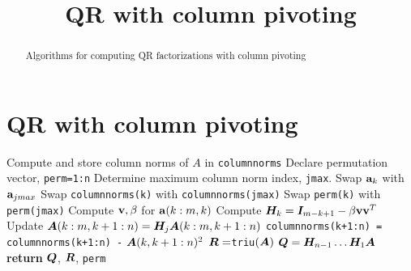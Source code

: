 \documentclass[preprint,12pt,authoryear]{elsarticle}
\begin{document}
\begin{frontmatter}


\title{QR with column pivoting}


\begin{abstract}{
Algorithms for computing QR factorizations with column pivoting
}
\end{abstract}

%

\end{frontmatter}

\section{QR with column pivoting}

\begin{algorithm}
  \caption{Businger and Golub QR with column pivoting}\label{Golub}
  \begin{algorithmic}[1]
    \State Compute and store column norms of $A$ in \texttt{columnnorms} 
    \State Declare permutation vector, \texttt{perm=1:n}
      	\State Determine maximum column norm index, \texttt{jmax}.
      	\State Swap $\mathbf{a}_{k}$ with $\mathbf{a}_{jmax}$ 
      	\State Swap \texttt{columnnorms(k)} with \texttt{columnnorms(jmax)} 
      	\State Swap \texttt{perm(k)} with \texttt{perm(jmax)}
      	\State Compute $\mathbf{v}, \beta$ for $\mathbf{a}(k:m,k)$  
		\State Compute $\bm{H}_{k} = \bm{I}_{m-k+1} - \beta \mathbf{v} \mathbf{v}^T$
		\State Update $\bm{A}(k:m, k+1 : n) = \bm{H}_{j} \bm{A}(k:m, k+1 : n)$
		\State \texttt{columnnorms(k+1:n) = columnnorms(k+1:n) -} $\bm{A}(k,k+1:n)^2$
      \EndFor
      \State $\bm{R}=$\texttt{triu}$(\bm{A})$
      \State $\bm{Q}=\bm{H}_{n-1} \ldots \bm{H}_{1} \bm{A}$
      \State \textbf{return} $\bm{Q}$, $\bm{R}$, \texttt{perm}
    \EndProcedure
  \end{algorithmic}
\end{algorithm}
\end{document}
